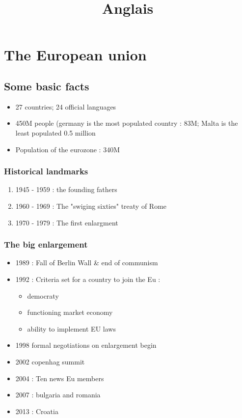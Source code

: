 \documentclass{article}
\title{Anglais}
\begin{document}
\maketitle
\tableofcontents
\newpage


\section{The European union}
\subsection{Some basic facts}
\begin{itemize}
	\item 27 countries; 24 official languages
	\item 450M people (germany is the most populated country : 83M; Malta is the least populated 0.5 million
	\item Population of the eurozone : 340M
\end{itemize}
\subsubsection{Historical landmarks}
\begin{enumerate}
	\item 1945 - 1959 :  the founding fathers
	\item 1960 - 1969 : The "swiging sixties" treaty of Rome 
	\item 1970 - 1979 : The first enlargment
\end{enumerate}
\subsubsection{The big enlargement}
\begin{itemize}
	\item 1989 : Fall of Berlin Wall & end of communism
	\item 1992 : Criteria set for a country to join the Eu : 
	\begin{itemize}
		\item democraty
		\item functioning market economy
		\item ability to implement EU laws
	\end{itemize}
	\item 1998 formal negotiations on enlargement begin
	\item 2002 copenhag summit 
	\item 2004 : Ten news Eu members
	\item 2007 : bulgaria and romania
	\item 2013 : Croatia
\end{itemize}
\end{document}
